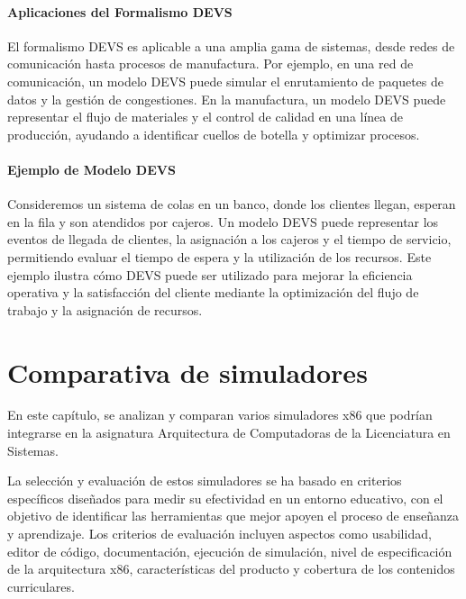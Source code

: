 \documentclass[12pt,twoside]{templates/unerthesis}
\begin{document}
\hypertarget{aplicaciones-del-formalismo-devs}{%
\subsubsection{Aplicaciones del Formalismo DEVS}\label{aplicaciones-del-formalismo-devs}}

El formalismo DEVS es aplicable a una amplia gama de sistemas, desde redes de comunicación hasta procesos de manufactura. Por ejemplo, en una red de comunicación, un modelo DEVS puede simular el enrutamiento de paquetes de datos y la gestión de congestiones. En la manufactura, un modelo DEVS puede representar el flujo de materiales y el control de calidad en una línea de producción, ayudando a identificar cuellos de botella y optimizar procesos.

\hypertarget{ejemplo-de-modelo-devs}{%
\subsubsection{Ejemplo de Modelo DEVS}\label{ejemplo-de-modelo-devs}}

Consideremos un sistema de colas en un banco, donde los clientes llegan, esperan en la fila y son atendidos por cajeros. Un modelo DEVS puede representar los eventos de llegada de clientes, la asignación a los cajeros y el tiempo de servicio, permitiendo evaluar el tiempo de espera y la utilización de los recursos. Este ejemplo ilustra cómo DEVS puede ser utilizado para mejorar la eficiencia operativa y la satisfacción del cliente mediante la optimización del flujo de trabajo y la asignación de recursos.

\hypertarget{comparativa-de-simuladores}{%
\chapter{Comparativa de simuladores}\label{comparativa-de-simuladores}}

En este capítulo, se analizan y comparan varios simuladores x86 que podrían integrarse en la asignatura Arquitectura de Computadoras de la Licenciatura en Sistemas.

La selección y evaluación de estos simuladores se ha basado en criterios específicos diseñados para medir su efectividad en un entorno educativo, con el objetivo de identificar las herramientas que mejor apoyen el proceso de enseñanza y aprendizaje. Los criterios de evaluación incluyen aspectos como usabilidad, editor de código, documentación, ejecución de simulación, nivel de especificación de la arquitectura x86, características del producto y cobertura de los contenidos curriculares.
\end{document}
